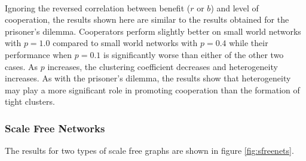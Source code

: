\documentclass{article}
\begin{document}
	\paragraph{}Ignoring the reversed correlation between benefit ($r$ or $b$) and level of cooperation, the results shown here are similar to the results obtained for the prisoner's dilemma.  Cooperators perform slightly better on small world networks with $p=1.0$ compared to small world networks with $p=0.4$ while their performance when $p=0.1$ is significantly worse than either of the other two cases.  As $p$ increases, the clustering coefficient decreases and heterogeneity increases.  As with the prisoner's dilemma, the results show that heterogeneity may play a more significant role in promoting cooperation than the formation of tight clusters.

	\subsubsection{Scale Free Networks}
	The results for two types of scale free graphs are shown in figure \ref{fig:sfreenets}.
\end{document}
